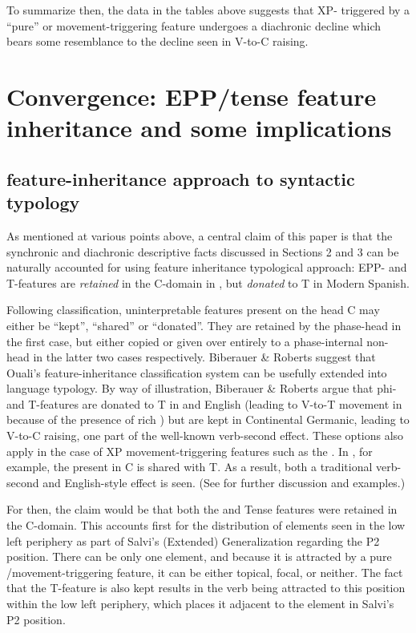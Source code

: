 \documentclass[output=paper]{LSP/langsci}
\begin{document}
To summarize then, the data in the tables above suggests that XP- triggered by a ``pure''  or movement-triggering feature undergoes a diachronic decline which bears some resemblance to the decline seen in V-to-C raising.  

\section{Convergence:  EPP/tense feature inheritance and some implications}\label{sec:poole:4}
\subsection{ feature-inheritance approach to syntactic typology}\label{sec:poole:4.1}
As mentioned at various points above, a central claim of this paper is that the synchronic and diachronic descriptive facts discussed in Sections 2 and 3 can be naturally accounted for using  feature inheritance typological approach:  EPP- and T-features are \textit{retained} in the C-domain in , but \textit{donated} to T in Modern Spanish.

Following  classification, uninterpretable features present on the  head C may either be ``kept'', ``shared'' or ``donated''.  They are retained by the phase-head in the first case, but either copied or given over entirely to a phase-internal non- head in the latter two cases respectively.  Biberauer \& Roberts suggest that Ouali’s feature-inheritance classification system can be usefully extended into language typology.  By way of illustration, Biberauer \& Roberts argue that phi- and T-features are donated to T in  and English (leading to V-to-T movement in  because of the presence of rich ) but are kept in Continental Germanic, leading to V-to-C raising, one part of the well-known verb-second effect.  These options also apply in the case of XP movement-triggering features such as the .  In , for example, the  present in C is shared with T.  As a result, both a traditional verb-second and English-style  effect is seen.  (See \citealt[Section~3]{BiberauerRoberts2010} for further discussion and examples.)

For  then, the claim would be that both the  and Tense features were retained in the C-domain.  This accounts first for the distribution of elements seen in the low left periphery as part of Salvi’s (Extended) Generalization regarding the P2 position.  There can be only one element, and because it is attracted by a pure /movement-triggering feature, it can be either topical, focal, or neither.  The fact that the T-feature is also kept results in the verb being attracted to this position within the low left periphery, which places it adjacent to the element in Salvi’s P2 position.  
\end{document}
